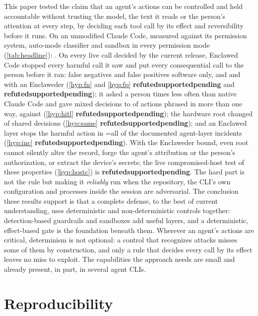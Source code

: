 \documentclass[11pt]{article}
\newcommand{\sys}{Enclawed}
\newcommand{\dev}{Enclaweder}
\newcommand{\cz}{Enclawed Code}
\newcommand{\czVerdict}[1]{\textbf{\ifcase#1 refuted\or supported\or pending\fi}}
\newcommand{\VerdictHone}{\czVerdict{\HoneCode}}
\newcommand{\VerdictHtwo}{\czVerdict{\HtwoCode}}
\newcommand{\VerdictHthree}{\czVerdict{\HthreeCode}}
\newcommand{\VerdictHfour}{\czVerdict{\HfourCode}}
\newcommand{\VerdictHfive}{\czVerdict{\HfiveCode}}
\newcommand{\VerdictHsix}{\czVerdict{\HsixCode}}
\begin{document}
This paper tested the claim that an agent's actions can be controlled
and held accountable without trusting the model, the text it reads or
the person's attention at every step, by deciding each tool call by its
effect and reversibility before it runs. On an unmodified Claude Code,
measured against its permission system, auto-mode classifier and sandbox
in every permission mode (\cref{tab:headline}): \HeadAxesSentence{}. On
every live call decided by the current release, \cz{} stopped every
harmful call it saw and put every consequential call to the person
before it ran: \CzOneFN{} false negatives and \CzOneFP{} false positives
software only, and \CzTwoFN{} and \CzTwoFP{} with an \dev{}
(\ref{hyp:fn} and \ref{hyp:fp} \VerdictHone{} and \VerdictHtwo{}); it
asked a person \CzOneHitlFactorDefault{} times less often than native
Claude Code and gave mixed decisions to \SameCzOneMixedShare{} of actions
phrased in more than one way, against \SameNativeMixedShare{}
(\ref{hyp:hitl} \VerdictHthree{}); the hardware root changed
\SharedCallsDiffer{} of \SharedCalls{} shared decisions (\ref{hyp:same}
\VerdictHfour{}); and an \sys{} layer stops the harmful action in
\ifnum\IncStopped=\IncLayerTotal\relax all \fi\IncStopped{} of the \IncLayerTotal{} documented agent-layer incidents
(\ref{hyp:inc} \VerdictHsix{}). With the \dev{} bound, even root cannot
silently alter the record, forge the agent's attribution or the person's
authorization, or extract the device's secrets; the live compromised-host
test of these properties (\ref{hyp:hostc}) is \VerdictHfive{}. The hard
part is not the rule but making it \emph{reliably} run when the
repository, the CLI's own configuration and processes inside the session
are adversarial. The conclusion these results support is that a
complete defense, to the best of current understanding, uses
deterministic and non-deterministic controls together: detection-based
guardrails and sandboxes add useful layers, and a deterministic,
effect-based gate is the foundation beneath them. Wherever an agent's
actions are critical, determinism is not optional: a control that
recognizes attacks misses some of them by construction, and only a rule
that decides every call by its effect leaves no miss to exploit. The
capabilities the approach needs are small and already present, in part,
in several agent CLIs.

\section*{Reproducibility}
\label{sec:repro}
\end{document}

